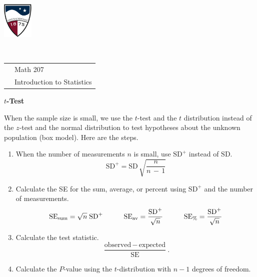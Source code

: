 \documentclass[10pt]{article}
\begin{document}
\pagestyle{empty}
\lstset{language=R, showspaces=false, showstringspaces=false}
\href{http://www.su.edu}{\includegraphics[height=1.75cm]{sulogo.eps}}
\vspace{-1.79cm}

{{\ }\hfill\small
\begin{tabular}{cl}
& Math 207\\
& Introduction to Statistics\\
\end{tabular}
}

\setlength{\baselineskip}{1.05\baselineskip}
\newcommand{\HH}{\hspace{20pt}\hphantom{a) } }


\begin{center}
\textbf{\large  $t$-Test}
\end{center}
\smallskip

When the sample size is small, we use the $t$-test and the $t$ distribution
instead of the $z$-test and the normal distribution to test hypotheses about
the unknown population (box model).  Here are the steps.
\begin{enumerate}
\item When the number of measurements $n$ is small, use $\mbox{SD}^+$ 
  instead of $\mbox{SD}$.
\[\mbox{SD}^+ = \mbox{SD}\,\sqrt{\frac{n}{n\,-\,1}}\]
\item Calculate the SE for the sum, average, or percent using $\mbox{SD}^+$
  and the number of measurements.
\[\mbox{SE}_{\scriptsize\mbox{sum}}=\sqrt{n}\;\mbox{SD}^+\hspace{30pt}
 \mbox{SE}_{\scriptsize\mbox{av}}=\frac{\mbox{SD}^+}{\sqrt{n}}\hspace{30pt}
 \mbox{SE}_{\scriptsize\mbox{\%}}=\frac{\mbox{SD}^+}{\sqrt{n}}\]
\item Calculate the test statistic.
\[\frac{\mbox{observed} \, -\, \mbox{expected}}{\mbox{SE}}.\]
\item Calculate the $P$-value using the $t$-distribution with 
  $n-1$ degrees of freedom.
\end{enumerate}
\end{document}
